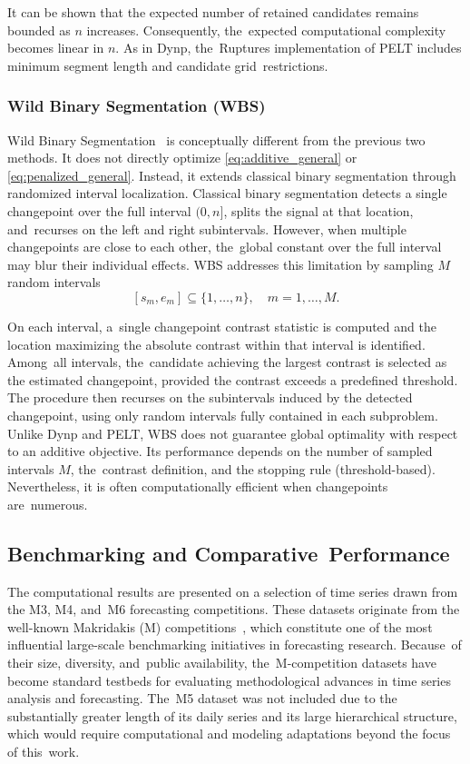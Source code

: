 \documentclass[mathematics,article,accept,pdftex,moreauthors]{Definitions/mdpi}
\begin{document}
It can be shown that the expected number of retained candidates remains bounded as $n$ increases. Consequently, the~expected computational complexity becomes linear in $n$. 
As in Dynp, the~Ruptures implementation of PELT includes minimum segment length and candidate grid~restrictions.

\subsubsection{Wild Binary Segmentation (WBS)}
Wild Binary Segmentation~\cite{F14} is conceptually different from the previous two methods. It does not directly optimize \eqref{eq:additive_general} or \eqref{eq:penalized_general}. Instead, it extends classical binary segmentation through randomized interval localization. 
Classical binary segmentation detects a single changepoint over the full interval $(0,n]$, splits the signal at that location, and~recurses on the left and right subintervals. However, when multiple changepoints are close to each other, the~global constant over the full interval may blur their individual effects. 
WBS addresses this limitation by sampling $M$ random intervals \[
[s_m,e_m] \subseteq \{1,\dots,n\},
\quad m=1,\dots,M.
\]

On each interval, a~single changepoint contrast statistic is computed and the location maximizing the absolute contrast within that interval is identified. Among~all intervals, the~candidate achieving the largest contrast is selected as the estimated changepoint, provided the contrast exceeds a predefined threshold. 
The procedure then recurses on the subintervals induced by the detected changepoint, using only random intervals fully contained in each subproblem. 
Unlike Dynp and PELT, WBS does not guarantee global optimality with respect to an additive objective. Its performance depends on the number of sampled intervals $M$, the~contrast definition, and the stopping rule (threshold-based). Nevertheless, it is often computationally efficient when changepoints are~numerous. 

\subsection{Benchmarking and Comparative~Performance} \label{subsec:benchmarking}

The computational results are presented on a selection of time series drawn from the M3, M4, and~M6 forecasting competitions. These datasets originate from the well-known Makridakis (M) competitions~\cite{MH79}, which constitute one of the most influential large-scale benchmarking initiatives in forecasting research. Because~of their size, diversity, and~public availability, the~M-competition datasets have become standard testbeds for evaluating methodological advances in time series analysis and forecasting. The~M5 dataset was not included due to the substantially greater length of its daily series and its large hierarchical structure, which would require computational and modeling adaptations beyond the focus of this~work.
\end{document}
